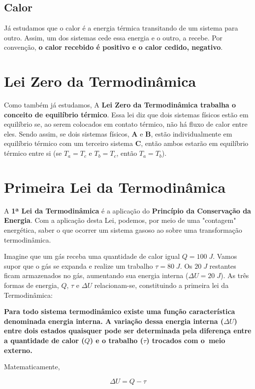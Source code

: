 \documentclass[12pt]{article}
\begin{document}
\hypertarget{x-calor}{\subsection{Calor}}
Já estudamos que o calor é a energia térmica transitando de um sistema para outro. Assim, um dos sistemas cede essa energia e o outro, a recebe. Por convenção, \textbf{o calor recebido é positivo e o calor cedido, negativo}.


\hypertarget{x-lei-zero-da-termodinâmica}{\section{Lei Zero da Termodinâmica}}
Como também já estudamos, A \textbf{Lei Zero da Termodinâmica trabalha o conceito de equilíbrio térmico}. Essa lei diz que dois sistemas físicos estão em equilíbrio se, ao serem colocados em contato térmico, não há fluxo de calor entre eles. Sendo assim, se dois sistemas físicos, \textbf{A} e \textbf{B}, estão individualmente em equilíbrio térmico com um terceiro sistema \textbf{C}, então ambos estarão em equilíbrio térmico entre si (se $T_{a}=T_{c}$ e $T_{b}=T_{c}$, então $T_{a}=T_{b}$).


\hypertarget{x-primeira-lei-da-termodinâmica}{\section{Primeira Lei da Termodinâmica}}
A \textbf{1ª Lei da Termodinâmica} é a aplicação do \textbf{Princípio  da Conservação  da Energia}. Com a aplicação desta Lei, podemos, por meio de uma "contagem" energética, saber o que ocorrer um sistema gasoso ao sobre uma transformação termodinâmica.


Imagine que um gás receba uma quantidade de calor igual $Q = 100\;J$. Vamos supor que o gás se expanda e realize um trabalho $\tau = 80\;J$. Os $20\;J$ restantes ficam armazenados no gás, aumentando sua energia interna ($\Delta U=20\;J$). As três formas de energia, $Q$,  $\tau$  e $\Delta U$ relacionam-se, constituindo a primeira lei da Termodinâmica:


\textbf{Para todo sistema termodinâmico existe uma função característica denominada energia interna. A variação dessa energia interna ($\Delta U$) entre dois estados quaisquer pode ser determinada  pela diferença entre a quantidade de calor ($Q$) e o trabalho ($\tau$) trocados com o meio externo.}


Matematicamente,


\begin{equation}
    \Delta U=Q-\tau
\end{equation}
\end{document}
